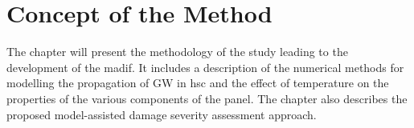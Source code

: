 
\chapter[Concept of the Method]{Concept of the Method}
\label{ch:method}

The chapter will present the methodology of the study leading to the development of the \ac{madif}.
It includes a description of the numerical methods for modelling the propagation of GW in \ac{hsc} and the effect of temperature on the properties of the various components of the panel.
The chapter also describes the proposed model-assisted damage severity assessment approach.




%

